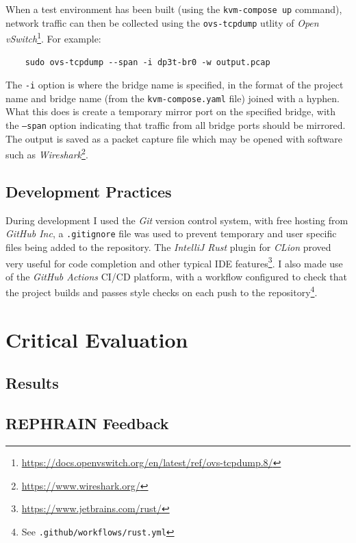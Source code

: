 \documentclass[
    author={Jacob Daniel Halsey},
    supervisor={Prof. Awais Rashid},
    degree={BSc},
    title={Building a Testbed for Evaluating Privacy Enhancing Technologies  (PETs)},
    subtitle={},
    type={software development},
    year={2021}
]{dissertation}
\begin{document}
When a test environment has been built (using the \texttt{kvm-compose up} command), network
traffic can then be collected using the \texttt{ovs-tcpdump} utlity of 
\emph{Open vSwitch}\footnote{\url{https://docs.openvswitch.org/en/latest/ref/ovs-tcpdump.8/}}.
For example:

\begin{verbatim}
	sudo ovs-tcpdump --span -i dp3t-br0 -w output.pcap
\end{verbatim}

The \texttt{-i} option is where the bridge name is specified, in the format of the project name
and bridge name (from the \texttt{kvm-compose.yaml} file) joined with a hyphen.
What this does is create a temporary mirror port on the specified bridge, with the \texttt{--span}
option indicating that traffic from all bridge ports should be mirrored. The output is saved as a
packet capture file which may be opened with software such as 
\emph{Wireshark}\footnote{\url{https://www.wireshark.org/}}.

\section{Development Practices}

During development I used the \emph{Git} version control system, with free hosting from \emph{GitHub Inc},
a \texttt{.gitignore} file was used to prevent temporary and user specific files being added to the
repository.
The \emph{IntelliJ Rust} plugin for \emph{CLion} proved very useful for code completion and other typical
IDE features\footnote{\url{https://www.jetbrains.com/rust/}}.
I also made use of the \emph{GitHub Actions} CI/CD platform, with a workflow configured to check that
the project builds and passes style checks on each push to the repository\footnote{See 
\texttt{.github/workflows/rust.yml}}. 

\chapter{Critical Evaluation}
\label{chap:evaluation}

\section{Results}


\section{REPHRAIN Feedback}
\end{document}
